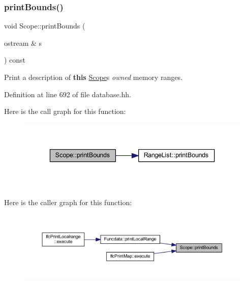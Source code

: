 \subsubsection{\texorpdfstring{printBounds()}{printBounds()}}
{\footnotesize\ttfamily void Scope\+::print\+Bounds (\begin{DoxyParamCaption}\item[{ostream \&}]{s }\end{DoxyParamCaption}) const\hspace{0.3cm}{\ttfamily [inline]}}



Print a description of {\bfseries{this}} \mbox{\hyperlink{class_scope}{Scope}}\textquotesingle{}s {\itshape owned} memory ranges. 



Definition at line 692 of file database.\+hh.

Here is the call graph for this function\+:
\nopagebreak
\begin{figure}[H]
\begin{center}
\leavevmode
\includegraphics[width=336pt]{class_scope_a865f1dd5e0c7dc9a5e65189cc7be2c9b_cgraph}
\end{center}
\end{figure}
Here is the caller graph for this function\+:
\nopagebreak
\begin{figure}[H]
\begin{center}
\leavevmode
\includegraphics[width=350pt]{class_scope_a865f1dd5e0c7dc9a5e65189cc7be2c9b_icgraph}
\end{center}
\end{figure}
\mbox{\label{class_scope_a7d67a1b9e60078023b508dd3cbe4447d}} 
